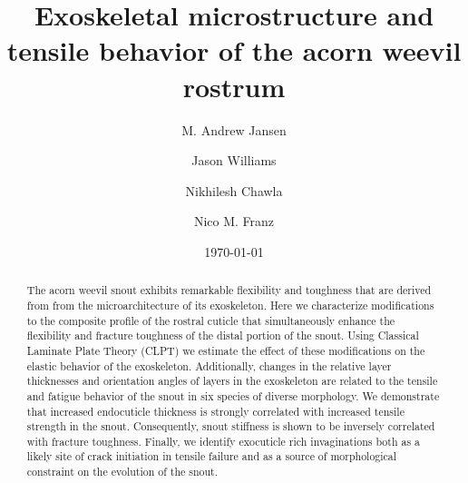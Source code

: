 \documentclass[twocolumn, linenumbers, superscriptaddress, nofootinbib]{revtex4-1}
\begin{document}
	\begin{abstract}
		The acorn weevil snout exhibits remarkable flexibility and toughness that are derived from from the microarchitecture of its exoskeleton.
		Here we characterize modifications to the composite profile of the rostral cuticle that simultaneously enhance the flexibility and fracture toughness of the distal portion of the snout.
		Using Classical Laminate Plate Theory (CLPT) we estimate the effect of these modifications on the elastic behavior of the exoskeleton.
		Additionally, changes in the relative layer thicknesses and orientation angles of layers in the exoskeleton are related to the tensile and fatigue behavior of the snout in six species of diverse morphology.
		We demonstrate that increased endocuticle thickness is strongly correlated with increased tensile strength in the snout.
		Consequently, snout stiffness is shown to be inversely correlated with fracture toughness.
		Finally, we identify exocuticle rich invaginations both as a likely site of crack initiation in tensile failure and as a source of morphological constraint on the evolution of the snout.
		
	\end{abstract}
	
	{\title{Exoskeletal microstructure and tensile behavior of the acorn weevil rostrum}
	\date{\today}
	
	\author{M. Andrew Jansen}
	\author{Jason Williams}
	\author{Nikhilesh Chawla}
	\author{Nico M. Franz}
		
	\maketitle
	}
	
\end{document}

